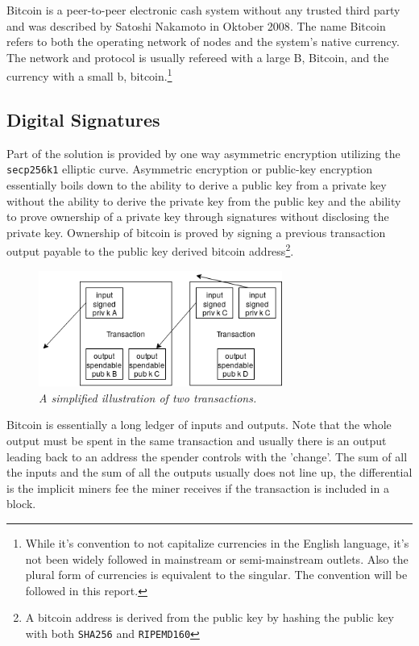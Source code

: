Bitcoin is a peer-to-peer electronic cash system without any trusted third party and was described by Satoshi Nakamoto in Oktober 2008\cite{nakamoto:bitcoin}. The name Bitcoin refers to both the operating network of nodes and the system's native currency. The network and protocol is usually refereed with a large B, Bitcoin, and the currency with a small b, bitcoin.\footnote{While it's convention to not capitalize currencies in the English language, it's not been widely followed in mainstream or semi-mainstream outlets. Also the plural form of currencies is equivalent to the singular. The convention will be followed in this report.}

\subsection{Digital Signatures}

Part of the solution is provided by one way asymmetric encryption utilizing the \texttt{secp256k1} elliptic curve. Asymmetric encryption or public-key encryption essentially boils down to the ability to derive a public key from a private key without the ability to derive the private key from the public key and the ability to prove ownership of a private key through signatures without disclosing the private key. Ownership of bitcoin is proved by signing a previous transaction output payable to the public key derived bitcoin address\footnote{A bitcoin address is derived from the public key by hashing the public key with both \texttt{SHA256} and \texttt{RIPEMD160}}. 

\begin{figure}[!htb]
	\hspace*{-2cm} 
	\centering
	\includegraphics[width=8cm]{transaction.png}
	\caption{\textit{A simplified illustration of two transactions. 
	}}
	\label{fig:merkle:tree}
	\hspace*{2mm} 	
\end{figure}

Bitcoin is essentially a long ledger of inputs and outputs. Note that the whole output must be spent in the same transaction and usually there is an output leading back to an address the spender controls with the 'change'. The sum of all the inputs and the sum of all the outputs usually does not line up, the differential is the implicit miners fee the miner receives if the transaction is included in a block. 

